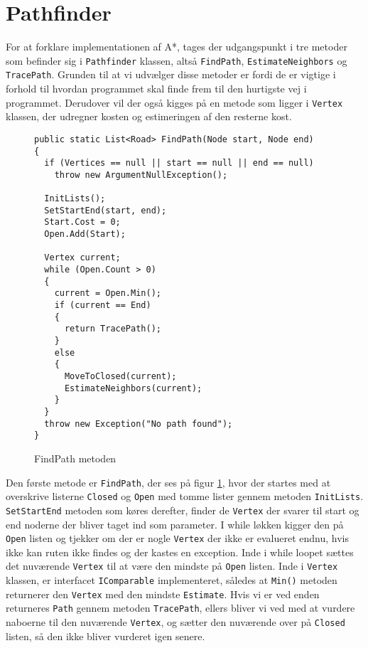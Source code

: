 \section{Pathfinder}\label{Pathfinder}
For at forklare implementationen af A*, tages der udgangspunkt i tre metoder som befinder sig i \texttt{Pathfinder} klassen, altså \texttt{FindPath}, \texttt{EstimateNeighbors} og \texttt{TracePath}. Grunden til at vi udvælger disse metoder er fordi de er vigtige i forhold til hvordan programmet skal finde frem til den hurtigste vej i programmet. Derudover vil der også kigges på en metode som ligger i \texttt{Vertex} klassen, der udregner kosten og estimeringen af den resterne kost.

\begin{figure}[H]
\begin{lstlisting}
public static List<Road> FindPath(Node start, Node end)
{
  if (Vertices == null || start == null || end == null)
    throw new ArgumentNullException();

  InitLists();
  SetStartEnd(start, end);
  Start.Cost = 0;
  Open.Add(Start);

  Vertex current;
  while (Open.Count > 0)
  {
    current = Open.Min();
    if (current == End)
    {
      return TracePath();
    } 
    else
    {
      MoveToClosed(current);
      EstimateNeighbors(current);
    }
  }
  throw new Exception("No path found");
}
\end{lstlisting}
\caption{FindPath metoden}\label{FindPathCode}
\end{figure}

Den første metode er \texttt{FindPath}, der ses på figur \ref{FindPathCode}, hvor der startes med at overskrive listerne \texttt{Closed} og \texttt{Open} med tomme lister gennem metoden \texttt{InitLists}. \texttt{SetStartEnd} metoden som køres derefter, finder de \texttt{Vertex} der svarer til start og end noderne der bliver taget ind som parameter. I while løkken kigger den på \texttt{Open} listen og tjekker om der er nogle \texttt{Vertex} der ikke er evalueret endnu, hvis ikke kan ruten ikke findes og der kastes en exception. Inde i while loopet sættes det nuværende \texttt{Vertex} til at være den mindste på \texttt{Open} listen. Inde i \texttt{Vertex} klassen, er interfacet \texttt{IComparable} implementeret, således at \texttt{Min()} metoden returnerer den \texttt{Vertex} med den mindste \texttt{Estimate}. Hvis vi er ved enden returneres \texttt{Path} gennem metoden \texttt{TracePath}, ellers bliver vi ved med at vurdere naboerne til den nuværende \texttt{Vertex}, og sætter den nuværende over på \texttt{Closed} listen, så den ikke bliver vurderet igen senere.

